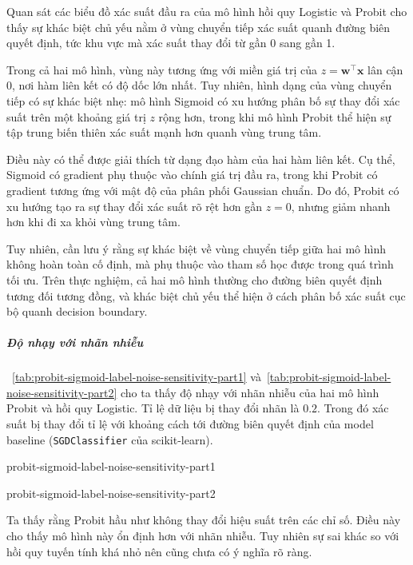 Quan sát các biểu đồ xác suất đầu ra của mô hình hồi quy Logistic và Probit
cho thấy sự khác biệt chủ yếu nằm ở vùng chuyển tiếp xác suất quanh đường biên
quyết định, tức khu vực mà xác suất thay đổi từ gần 0 sang gần 1.

Trong cả hai mô hình, vùng này tương ứng với miền giá trị của $z =
\boldsymbol{w}^\intercal \boldsymbol{x}$ lân cận 0, nơi hàm liên kết có độ dốc
lớn nhất. Tuy nhiên, hình dạng của vùng chuyển tiếp có sự khác biệt nhẹ: mô
hình Sigmoid có xu hướng phân bố sự thay đổi xác suất trên một khoảng giá trị
$z$ rộng hơn, trong khi mô hình Probit thể hiện sự tập trung biến thiên xác
suất mạnh hơn quanh vùng trung tâm.

Điều này có thể được giải thích từ dạng đạo hàm của hai hàm liên kết. Cụ thể,
Sigmoid có gradient phụ thuộc vào chính giá trị đầu ra, trong khi Probit có
gradient tương ứng với mật độ của phân phối Gaussian chuẩn. Do đó, Probit có xu
hướng tạo ra sự thay đổi xác suất rõ rệt hơn gần $z = 0$, nhưng giảm nhanh
hơn khi đi xa khỏi vùng trung tâm.

Tuy nhiên, cần lưu ý rằng sự khác biệt về vùng chuyển tiếp giữa hai mô hình
không hoàn toàn cố định, mà phụ thuộc vào tham số học được trong quá trình tối
ưu. Trên thực nghiệm, cả hai mô hình thường cho đường biên quyết định tương đối
tương đồng, và khác biệt chủ yếu thể hiện ở cách phân bố xác suất cục bộ quanh
decision boundary.

\subparagraph{Độ nhạy với nhãn nhiễu}

\tablename~\ref{tab:probit-sigmoid-label-noise-sensitivity-part1}
và~\ref{tab:probit-sigmoid-label-noise-sensitivity-part2} cho ta thấy độ nhạy
với nhãn nhiễu của hai mô hình Probit và hồi quy Logistic. Tỉ lệ dữ liệu bị
thay đổi nhãn là $0.2$. Trong đó xác suất bị thay đổi tỉ lệ với khoảng cách tới
đường biên quyết định của model baseline (\texttt{SGDClassifier} của
scikit-learn).

\begin{table}[htbp]
  \centering
  \caption{Độ nhạy với nhãn nhiễu trên 2 mô hình Probit và hồi quy tuyến tính
  (phần 1)}
  \label{tab:probit-sigmoid-label-noise-sensitivity-part1}
  {probit-sigmoid-label-noise-sensitivity-part1}
\end{table}

\begin{table}[htbp]
  \centering
  \caption{Độ nhạy với nhãn nhiễu trên 2 mô hình Probit và hồi quy tuyến tính
  (phần 2)}
  \label{tab:probit-sigmoid-label-noise-sensitivity-part2}
  {probit-sigmoid-label-noise-sensitivity-part2}
\end{table}

Ta thấy rằng Probit hầu như không thay đổi hiệu suất trên các chỉ số. Điều này
cho thấy mô hình này ổn định hơn với nhãn nhiễu. Tuy nhiên sự sai khác so với
hồi quy tuyến tính khá nhỏ nên cũng chưa có ý nghĩa rõ ràng.
